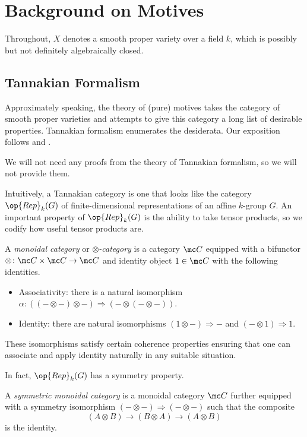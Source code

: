 \documentclass{article}
\begin{document}
\section{Background on Motives}
Throughout, $X$ denotes a smooth proper variety over a field $k$, which is possibly but not definitely algebraically closed.

\subsection{Tannakian Formalism}
Approximately speaking, the theory of (pure) motives takes the category of smooth proper varieties and attempts to give this category a long list of desirable properties. Tannakian formalism enumerates the desiderata. Our exposition follows \cite{milne-tannakian} and \cite[Chapters~2 and~6]{andre-motive}.
\begin{warn}
	We will not need any proofs from the theory of Tannakian formalism, so we will not provide them.
\end{warn}
Intuitively, a Tannakian category is one that looks like the category $\op{Rep}_k(G)$ of finite-dimensional representations of an affine $k$-group $G$. An important property of $\op{Rep}_k(G)$ is the ability to take tensor products, so we codify how useful tensor products are.
\begin{definition}[monoidal]
	A \textit{monoidal category} or \textit{$\otimes$-category} is a category $\mc C$ equipped with a bifunctor $\otimes\colon\mc C\times\mc C\to\mc C$ and identity object $1\in\mc C$ with the following identities.
	\begin{itemize}
		\item Associativity: there is a natural isomorphism $\alpha\colon((-\otimes-)\otimes-)\Rightarrow(-\otimes(-\otimes-))$.
		\item Identity: there are natural isomorphisms $(1\otimes-)\Rightarrow-$ and $(-\otimes1)\Rightarrow1$.
	\end{itemize}
	These isomorphisms satisfy certain coherence properties ensuring that one can associate and apply identity naturally in any suitable situation.
\end{definition}
In fact, $\op{Rep}_k(G)$ has a symmetry property.
\begin{definition}
	A \textit{symmetric monoidal category} is a monoidal category $\mc C$ further equipped with a symmetry isomorphism $(-\otimes-)\Rightarrow(-\otimes-)$ such that the composite
	\[(A\otimes B)\to(B\otimes A)\to(A\otimes B)\]
	is the identity.
\end{definition}
\end{document}
